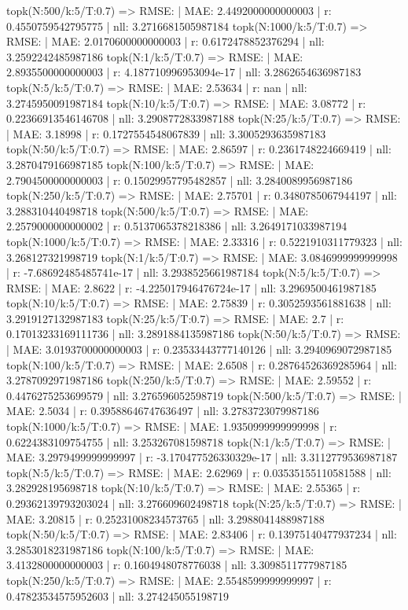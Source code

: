 topk(N:500/k:5/T:0.7) => RMSE: | MAE: 2.4492000000000003 | r: 0.4550759542795775 | nll: 3.2716681505987184
topk(N:1000/k:5/T:0.7) => RMSE: | MAE: 2.0170600000000003 | r: 0.6172478852376294 | nll: 3.2592242485987186
topk(N:1/k:5/T:0.7) => RMSE: | MAE: 2.8935500000000003 | r: 4.187710996953094e-17 | nll: 3.2862654636987183
topk(N:5/k:5/T:0.7) => RMSE: | MAE: 2.53634 | r: nan | nll: 3.2745950091987184
topk(N:10/k:5/T:0.7) => RMSE: | MAE: 3.08772 | r: 0.22366913546146708 | nll: 3.2908772833987188
topk(N:25/k:5/T:0.7) => RMSE: | MAE: 3.18998 | r: 0.1727554548067839 | nll: 3.3005293635987183
topk(N:50/k:5/T:0.7) => RMSE: | MAE: 2.86597 | r: 0.2361748224669419 | nll: 3.2870479166987185
topk(N:100/k:5/T:0.7) => RMSE: | MAE: 2.7904500000000003 | r: 0.15029957795482857 | nll: 3.2840089956987186
topk(N:250/k:5/T:0.7) => RMSE: | MAE: 2.75701 | r: 0.3480785067944197 | nll: 3.288310440498718
topk(N:500/k:5/T:0.7) => RMSE: | MAE: 2.2579000000000002 | r: 0.5137065378218386 | nll: 3.2649171033987194
topk(N:1000/k:5/T:0.7) => RMSE: | MAE: 2.33316 | r: 0.5221910311779323 | nll: 3.268127321998719
topk(N:1/k:5/T:0.7) => RMSE: | MAE: 3.0846999999999998 | r: -7.68692485485741e-17 | nll: 3.2938525661987184
topk(N:5/k:5/T:0.7) => RMSE: | MAE: 2.8622 | r: -4.225017946476724e-17 | nll: 3.2969500461987185
topk(N:10/k:5/T:0.7) => RMSE: | MAE: 2.75839 | r: 0.3052593561881638 | nll: 3.2919127132987183
topk(N:25/k:5/T:0.7) => RMSE: | MAE: 2.7 | r: 0.17013233169111736 | nll: 3.2891884135987186
topk(N:50/k:5/T:0.7) => RMSE: | MAE: 3.0193700000000003 | r: 0.23533443777140126 | nll: 3.2940969072987185
topk(N:100/k:5/T:0.7) => RMSE: | MAE: 2.6508 | r: 0.28764526369285964 | nll: 3.2787092971987186
topk(N:250/k:5/T:0.7) => RMSE: | MAE: 2.59552 | r: 0.4476275253699579 | nll: 3.276596052598719
topk(N:500/k:5/T:0.7) => RMSE: | MAE: 2.5034 | r: 0.39588646747636497 | nll: 3.2783723079987186
topk(N:1000/k:5/T:0.7) => RMSE: | MAE: 1.9350999999999998 | r: 0.6224383109754755 | nll: 3.253267081598718
topk(N:1/k:5/T:0.7) => RMSE: | MAE: 3.2979499999999997 | r: -3.170477526330329e-17 | nll: 3.3112779536987187
topk(N:5/k:5/T:0.7) => RMSE: | MAE: 2.62969 | r: 0.03535155110581588 | nll: 3.282928195698718
topk(N:10/k:5/T:0.7) => RMSE: | MAE: 2.55365 | r: 0.29362139793203024 | nll: 3.276609602498718
topk(N:25/k:5/T:0.7) => RMSE: | MAE: 3.20815 | r: 0.25231008234573765 | nll: 3.2988041488987188
topk(N:50/k:5/T:0.7) => RMSE: | MAE: 2.83406 | r: 0.13975140477937234 | nll: 3.2853018231987186
topk(N:100/k:5/T:0.7) => RMSE: | MAE: 3.4132800000000003 | r: 0.1604948078776038 | nll: 3.3098511777987185
topk(N:250/k:5/T:0.7) => RMSE: | MAE: 2.5548599999999997 | r: 0.47823534575952603 | nll: 3.274245055198719
